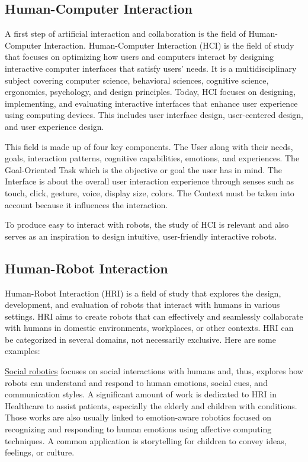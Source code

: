 \subsection{Human-Computer Interaction}

A first step of artificial interaction and collaboration is the field of Human-Computer Interaction. Human-Computer Interaction (HCI) is the field of study that focuses on optimizing how users and computers interact by designing interactive computer interfaces that satisfy users' needs. It is a multidisciplinary subject covering computer science, behavioral sciences, cognitive science, ergonomics, psychology, and design principles.
Today, HCI focuses on designing, implementing, and evaluating interactive interfaces that enhance user experience using computing devices. This includes user interface design, user-centered design, and user experience design. 

This field is made up of four key components. 
The User along with their needs, goals, interaction patterns, cognitive capabilities, emotions, and experiences.
The Goal-Oriented Task which is the objective or goal the user has in mind.
The Interface is about the overall user interaction experience through senses such as touch, click, gesture, voice, display size, colors.
The Context must be taken into account because it influences the interaction. 

To produce easy to interact with robots, the study of HCI is relevant and also serves as an inspiration to design intuitive, user-friendly interactive robots.

\subsection{Human-Robot Interaction}

Human-Robot Interaction (HRI) is a field of study that explores the design, development, and evaluation of robots that interact with humans in various settings. HRI aims to create robots that can effectively and seamlessly collaborate with humans in domestic environments, workplaces, or other contexts. 
HRI can be categorized in several domains, not necessarily exclusive. Here are some examples:

\uline{Social robotics} focuses on social interactions with humans and, thus, explores how robots can understand and respond to human emotions, social cues, and communication styles.
A significant amount of work is dedicated to HRI in Healthcare to assist patients, especially the elderly and children with conditions. Those works are also usually linked to emotion-aware robotics focused on recognizing and responding to human emotions using affective computing techniques. A common application is storytelling for children to convey ideas, feelings, or culture. 

